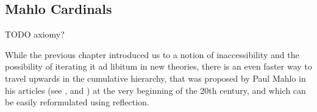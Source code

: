 \begin{comment}
 \newline\newline
 The next part, proving $\bold{(iii)} \then \bold{(ii)}$, should be elementary since $C$ is closed unbounded, which means that it contains at least countably many elements but we need only one such $\alpha$ to satisfy (\ref{def:reflection_2}).
 \newline
 Finally, we shall prove that $(ii) \then \bold{(i)}$. Since it obviously holds that $\kappa > \omega$, we have yet to prove that $\kappa$ is regular and a~strong limit. Let's argue by contradiction that it is regular. 
 If it wasn't, there would be a~$\beta < \kappa$ and a~function $F: \beta \implies \kappa$ with range unbounded in $\kappa$. Set $R = \{\beta\} \cup F$. By hypothesis there is an $\alpha < \kappa$ such that $\langle V_\alpha, \in, R \cap V_\alpha \rangle \prec \langle V_\kappa, \in, R \rangle$. Since $\beta$ is the single ordinal in R, $\beta \in V_\alpha$ by elementarity. This yields the desired contradiction since the domain if $F \cap V_\alpha$ cannot be all of $\beta$.
 \newline\newline
 Next, let's see whether $\kappa$ is indeed a~strong limit, again by contradiction. If not, there would be a~$\lambda < \kappa$ such that $2^\lambda \geq \kappa$. Let $G: \power{\lambda} \implies \kappa$ be surjective and set $R = \{\lambda + 1\} \cup G$. By hypothesis, there is an $\alpha < \kappa$ such that $\langle V_\alpha, \in, R \cap V_\alpha \rangle \prec \langle V_\kappa, \in, R \rangle$. $\lambda + 1 \in V_\alpha$ and so $\power{\lambda} \in V_\alpha$, but this is again a~contradiction.
\end{proof}
\
\end{comment}



\subsection{Mahlo Cardinals}

TODO axiomy?

While the previous chapter introduced us to a notion of inaccessibility and the possibility of iterating it ad libitum in new theories, there is an even faster way to travel upwards in the cumulative hierarchy, that was proposed by Paul Mahlo in his articles (see \cite{Mahlo11}, \cite{Mahlo12} and \cite{Mahlo13}) at the very beginning of the 20th century, and which can be easily reformulated using reflection.

